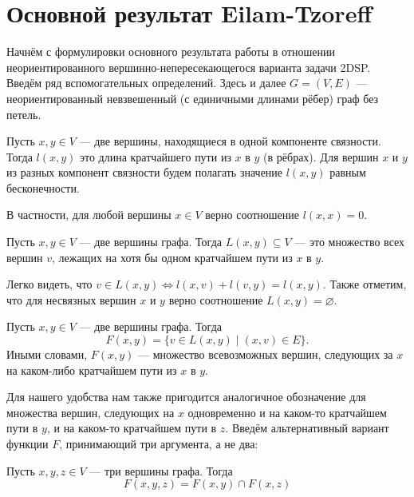\chapter{Основной результат Eilam-Tzoreff}

Начнём с формулировки основного результата работы \cite{ET} в отношении неориентированного вершинно-непересекающегося варианта задачи 2DSP. Введём ряд вспомогательных определений. Здесь и далее $G = (V, E)$ --- неориентированный невзвешенный (с единичными длинами рёбер) граф без петель.

\begin{definition} 
Пусть $x, y \in V$ --- две вершины, находящиеся в одной компоненте связности. Тогда $l(x, y)$ это длина кратчайшего пути из $x$ в $y$ (в рёбрах). Для вершин $x$ и $y$ из разных компонент связности будем полагать значение $l(x, y)$ равным бесконечности.
\end{definition}

В частности, для любой вершины $x \in V$ верно соотношение $l(x, x) = 0$.

\begin{definition} \label{is_between}
Пусть $x, y \in V$ --- две вершины графа. Тогда $L(x, y) \subseteq V$ --- это множество всех вершин $v$, лежащих на хотя бы одном кратчайшем пути из $x$ в $y$.
\end{definition}

Легко видеть, что $v \in L(x, y) \Leftrightarrow l(x, v) + l(v, y) = l(x, y)$. Также отметим, что для несвязных вершин $x$ и $y$ верно соотношение $L(x, y) = \varnothing$.

\begin{definition}
Пусть $x, y \in V$ --- две вершины графа. Тогда 
\begin{equation}
F(x, y) = \{v \in L(x, y) \mid (x, v) \in E\}.
\end{equation}
Иными словами, $F(x, y)$ --- множество всевозможных вершин, следующих за $x$ на каком-либо кратчайшем пути из $x$ в $y$. 
\end{definition}

Для нашего удобства нам также пригодится аналогичное обозначение для множества вершин, следующих на $x$ одновременно и на каком-то кратчайшем пути в $y$, и на каком-то кратчайшем пути в $z$. Введём альтернативный вариант функции $F$, принимающий три аргумента, а не два:

\begin{definition}
Пусть $x, y, z \in V$ --- три вершины графа. Тогда
\begin{equation}
F(x, y, z) = F(x, y) \cap F(x, z)
\end{equation}
\end{definition}

